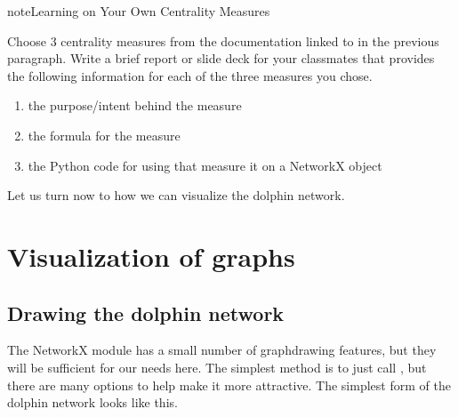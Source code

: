 \documentclass[letterpaper,10pt,english]{jupyterBook}
\begin{document}
\begin{sphinxadmonition}{note}{Learning on Your Own \sphinxhyphen{} Centrality Measures}

\sphinxAtStartPar
Choose 3 centrality measures from the documentation linked to in the previous paragraph.  Write a brief report or slide deck for your classmates that provides the following information for each of the three measures you chose.
\begin{enumerate}
%
\item {} 
\sphinxAtStartPar
the purpose/intent behind the measure

\item {} 
\sphinxAtStartPar
the formula for the measure

\item {} 
\sphinxAtStartPar
the Python code for using that measure it on a NetworkX  object

\end{enumerate}
\end{sphinxadmonition}

\sphinxAtStartPar
Let us turn now to how we can visualize the dolphin network.


\section{Visualization of graphs}
\label{\detokenize{chapter-15-networks:visualization-of-graphs}}

\subsection{Drawing the dolphin network}
\label{\detokenize{chapter-15-networks:drawing-the-dolphin-network}}
\sphinxAtStartPar
The NetworkX module has a small number of graph\sphinxhyphen{}drawing features, but they will be sufficient for our needs here.  The simplest method is to just call , but there are many options to help make it more attractive.  The simplest form of the dolphin network looks like this.

\begin{sphinxVerbatim}[commandchars=\\\{\}]
  
\end{sphinxVerbatim}

\noindent{}
\end{document}
